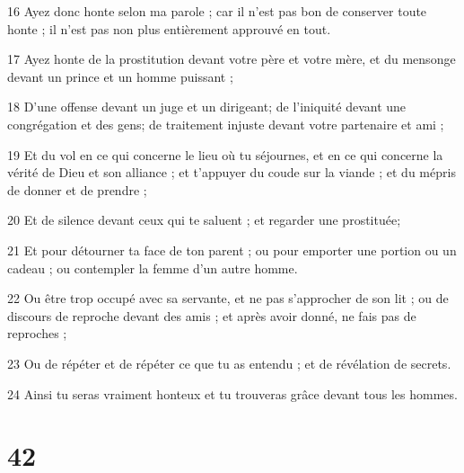 \par 16 Ayez donc honte selon ma parole ; car il n'est pas bon de conserver toute honte ; il n’est pas non plus entièrement approuvé en tout.
\par 17 Ayez honte de la prostitution devant votre père et votre mère, et du mensonge devant un prince et un homme puissant ;
\par 18 D'une offense devant un juge et un dirigeant; de l'iniquité devant une congrégation et des gens; de traitement injuste devant votre partenaire et ami ;
\par 19 Et du vol en ce qui concerne le lieu où tu séjournes, et en ce qui concerne la vérité de Dieu et son alliance ; et t'appuyer du coude sur la viande ; et du mépris de donner et de prendre ;
\par 20 Et de silence devant ceux qui te saluent ; et regarder une prostituée;
\par 21 Et pour détourner ta face de ton parent ; ou pour emporter une portion ou un cadeau ; ou contempler la femme d'un autre homme.
\par 22 Ou être trop occupé avec sa servante, et ne pas s'approcher de son lit ; ou de discours de reproche devant des amis ; et après avoir donné, ne fais pas de reproches ;
\par 23 Ou de répéter et de répéter ce que tu as entendu ; et de révélation de secrets.
\par 24 Ainsi tu seras vraiment honteux et tu trouveras grâce devant tous les hommes.

\chapter{42}

